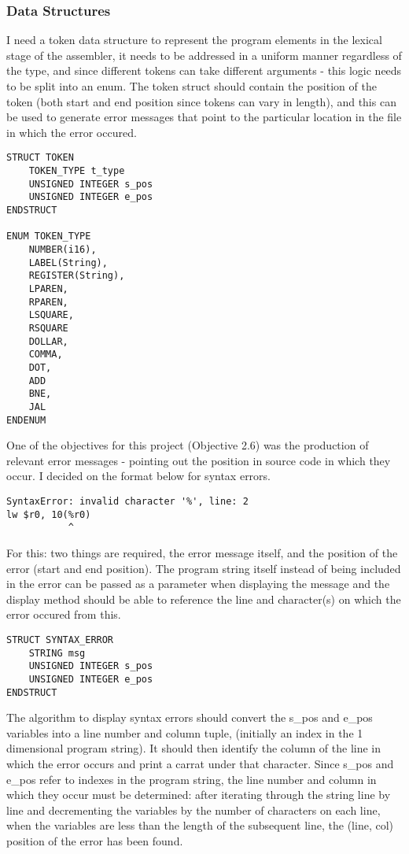 \subsubsection{Data Structures}

I need a token data structure to represent the program elements in the lexical stage of the assembler, it needs to be addressed in a uniform manner regardless of the type, and since different tokens can take different arguments - this logic needs to be split into an enum. The token struct should contain the position of the token (both start and end position since tokens can vary in length), and this can be used to generate error messages that point to the particular location in the file in which the error occured. 

\begin{lstlisting}
STRUCT TOKEN 
    TOKEN_TYPE t_type
    UNSIGNED INTEGER s_pos 
    UNSIGNED INTEGER e_pos 
ENDSTRUCT 

ENUM TOKEN_TYPE
    NUMBER(i16),
    LABEL(String),
    REGISTER(String),
    LPAREN,
    RPAREN,
    LSQUARE,
    RSQUARE
    DOLLAR,
    COMMA,
    DOT,
    ADD 
    BNE, 
    JAL
ENDENUM
\end{lstlisting}

One of the objectives for this project (Objective 2.6) was the production of relevant error messages - pointing out the position in source code in which they occur. I decided on the format below for syntax errors. 

\begin{lstlisting}
SyntaxError: invalid character '%', line: 2
lw $r0, 10(%r0)
           ^
\end{lstlisting}

For this: two things are required, the error message itself, and the position of the error (start and end position). The program string itself instead of being included in the error can be passed as a parameter when displaying the message and the display method should be able to reference the line and character(s) on which the error occured from this.

\begin{lstlisting}
STRUCT SYNTAX_ERROR
    STRING msg
    UNSIGNED INTEGER s_pos 
    UNSIGNED INTEGER e_pos
ENDSTRUCT
\end{lstlisting}

The algorithm to display syntax errors should convert the s\_pos and e\_pos variables into a line number and column tuple, (initially an index in the 1 dimensional program string). It should then identify the column of the line in which the error occurs and print a carrat under that character. Since s\_pos and e\_pos refer to indexes in the program string, the line number and column in which they occur must be determined: after iterating through the string line by line and decrementing the variables by the number of characters on each line, when the variables are less than the length of the subsequent line, the (line, col) position of the error has been found.


